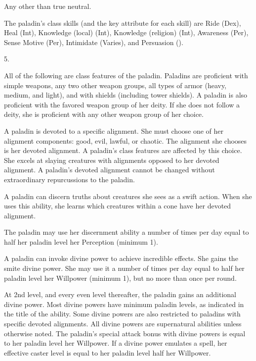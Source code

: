  Any other than true neutral.

The paladin's class skills (and the key attribute for each skill) are Ride (Dex), Heal (Int), Knowledge (local) (Int), Knowledge (religion) (Int), Awareness (Per), Sense Motive (Per), Intimidate (Varies), and Persuasion (\x).

5.

All of the following are class features of the paladin.
 Paladins are proficient with simple weapons,  any two other weapon groups,  all types of armor (heavy, medium, and light), and with  shields (including tower shields).
A paladin is also proficient with the favored weapon group of her deity.
If she does not follow a deity, she is proficient with any other weapon group of her choice.

A paladin is devoted to a specific alignment.
She must choose one of her alignment components: good, evil, lawful, or chaotic.
The alignment she chooses is her devoted alignment.
A paladin's class features are affected by this choice.
She excels at slaying creatures with alignments opposed to her devoted alignment.
A paladin's devoted alignment cannot be changed without extraordinary repurcussions to the paladin.

A paladin can discern truths about creatures she sees as a swift action.
When she uses this ability, she learns which creatures within a \arealarge cone have her devoted alignment.

The paladin may use her discernment ability a number of times per day equal to half her paladin level \add her Perception (minimum 1).

A paladin can invoke divine power to achieve incredible effects.
She gains the smite divine power.
She may use it a number of times per day equal to half her paladin level \add her Willpower (minimum 1), but no more than once per round.

At 2nd level, and every even level thereafter, the paladin gains an additional divine power.
Most divine powers have minimum paladin levels, as indicated in the title of the ability.
Some divine powers are also restricted to paladins with specific devoted alignments.
All divine powers are supernatural abilities unless otherwise noted.
The paladin's special attack bonus with divine powers is equal to her paladin level \add her Willpower.
If a divine power emulates a spell, her effective caster level is equal to her paladin level \add half her Willpower.

